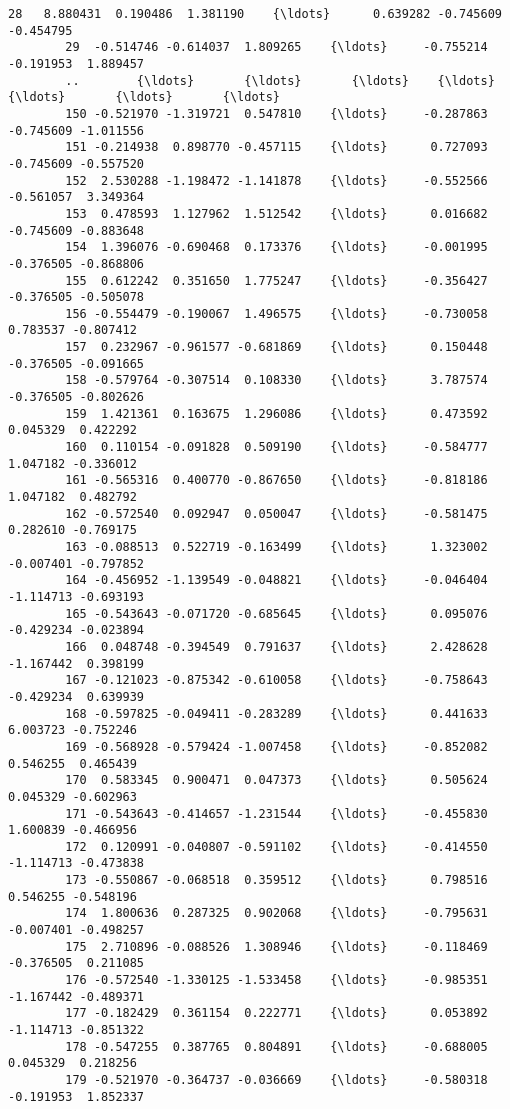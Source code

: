 \documentclass[11pt]{article}
\begin{document}
\begin{Verbatim}[commandchars=\\\{\}]
        28   8.880431  0.190486  1.381190    {\ldots}      0.639282 -0.745609 -0.454795   
        29  -0.514746 -0.614037  1.809265    {\ldots}     -0.755214 -0.191953  1.889457   
        ..        {\ldots}       {\ldots}       {\ldots}    {\ldots}           {\ldots}       {\ldots}       {\ldots}   
        150 -0.521970 -1.319721  0.547810    {\ldots}     -0.287863 -0.745609 -1.011556   
        151 -0.214938  0.898770 -0.457115    {\ldots}      0.727093 -0.745609 -0.557520   
        152  2.530288 -1.198472 -1.141878    {\ldots}     -0.552566 -0.561057  3.349364   
        153  0.478593  1.127962  1.512542    {\ldots}      0.016682 -0.745609 -0.883648   
        154  1.396076 -0.690468  0.173376    {\ldots}     -0.001995 -0.376505 -0.868806   
        155  0.612242  0.351650  1.775247    {\ldots}     -0.356427 -0.376505 -0.505078   
        156 -0.554479 -0.190067  1.496575    {\ldots}     -0.730058  0.783537 -0.807412   
        157  0.232967 -0.961577 -0.681869    {\ldots}      0.150448 -0.376505 -0.091665   
        158 -0.579764 -0.307514  0.108330    {\ldots}      3.787574 -0.376505 -0.802626   
        159  1.421361  0.163675  1.296086    {\ldots}      0.473592  0.045329  0.422292   
        160  0.110154 -0.091828  0.509190    {\ldots}     -0.584777  1.047182 -0.336012   
        161 -0.565316  0.400770 -0.867650    {\ldots}     -0.818186  1.047182  0.482792   
        162 -0.572540  0.092947  0.050047    {\ldots}     -0.581475  0.282610 -0.769175   
        163 -0.088513  0.522719 -0.163499    {\ldots}      1.323002 -0.007401 -0.797852   
        164 -0.456952 -1.139549 -0.048821    {\ldots}     -0.046404 -1.114713 -0.693193   
        165 -0.543643 -0.071720 -0.685645    {\ldots}      0.095076 -0.429234 -0.023894   
        166  0.048748 -0.394549  0.791637    {\ldots}      2.428628 -1.167442  0.398199   
        167 -0.121023 -0.875342 -0.610058    {\ldots}     -0.758643 -0.429234  0.639939   
        168 -0.597825 -0.049411 -0.283289    {\ldots}      0.441633  6.003723 -0.752246   
        169 -0.568928 -0.579424 -1.007458    {\ldots}     -0.852082  0.546255  0.465439   
        170  0.583345  0.900471  0.047373    {\ldots}      0.505624  0.045329 -0.602963   
        171 -0.543643 -0.414657 -1.231544    {\ldots}     -0.455830  1.600839 -0.466956   
        172  0.120991 -0.040807 -0.591102    {\ldots}     -0.414550 -1.114713 -0.473838   
        173 -0.550867 -0.068518  0.359512    {\ldots}      0.798516  0.546255 -0.548196   
        174  1.800636  0.287325  0.902068    {\ldots}     -0.795631 -0.007401 -0.498257   
        175  2.710896 -0.088526  1.308946    {\ldots}     -0.118469 -0.376505  0.211085   
        176 -0.572540 -1.330125 -1.533458    {\ldots}     -0.985351 -1.167442 -0.489371   
        177 -0.182429  0.361154  0.222771    {\ldots}      0.053892 -1.114713 -0.851322   
        178 -0.547255  0.387765  0.804891    {\ldots}     -0.688005  0.045329  0.218256   
        179 -0.521970 -0.364737 -0.036669    {\ldots}     -0.580318 -0.191953  1.852337   
        

\end{Verbatim}
\end{document}
